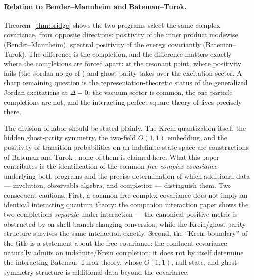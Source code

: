 \documentclass[11pt]{article}
\theoremstyle{definition}
\theoremstyle{remark}
\begin{document}
\paragraph{Relation to Bender--Mannheim and Bateman--Turok.}
Theorem~\ref{thm:bridge} shows the two programs select the same complex
covariance,
from opposite directions: positivity of the inner product modewise
(Bender--Mannheim), spectral positivity of the energy covariantly
(Bateman--Turok).  The difference is the completion, and the difference
matters exactly where the completions are forced apart: at the resonant
point, where positivity fails (the Jordan no-go of \cite{companion1}) and
ghost parity takes over the excitation sector.  A sharp remaining
question is the representation-theoretic status of the generalized Jordan
excitations at $\Delta=0$: the vacuum sector is common, the one-particle
completions are not, and the interacting perfect-square theory of
\cite{BT2026} lives precisely there.

The division of labor should be stated plainly.  The Krein quantization
itself, the hidden ghost-parity symmetry, the two-field $O(1,1)$
embedding, and the positivity of transition probabilities on an
indefinite state space are constructions of Bateman and Turok
\cite{BT2026}; none of them is claimed here.  What this paper
contributes is the identification of the common \emph{free complex
covariance} underlying both programs and the precise determination of
which additional data --- involution, observable algebra, and completion
--- distinguish them.  Two consequent cautions.  First, a common free
complex covariance does not imply an identical interacting quantum
theory: the companion interaction paper \cite{companion5} shows the two
completions \emph{separate} under interaction --- the canonical positive
metric is obstructed by on-shell branch-changing conversion, while the
Krein/ghost-parity structure survives the same interaction exactly.
Second, the ``Krein boundary'' of the title is a statement about the
free covariance: the confluent covariance naturally admits an
indefinite/Krein completion; it does not by itself determine the
interacting Bateman--Turok theory, whose $O(1,1)$, null-state, and
ghost-symmetry structure is additional data beyond the covariance.
\end{document}
